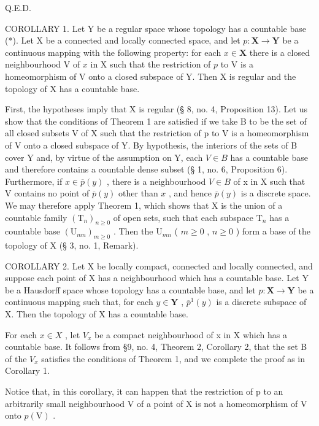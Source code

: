 Q.E.D.

COROLLARY 1. Let Y be a regular space whose topology has a countable base (*). Let X be a connected and locally connected space, and let \(p: \mathbf{X} \to \mathbf{Y}\) be a continuous mapping with the following property: for each \(x \in \mathbf{X}\) there is a closed neighbourhood V of \(x\) in X such that the restriction of \(p\) to V is a homeomorphism of V onto a closed subspace of Y. Then X is regular and the topology of X has a countable base.

First, the hypotheses imply that X is regular (§ 8, no. 4, Proposition 13). Let us show that the conditions of Theorem 1 are satisfied if we take B to be the set of all closed subsets V of X such that the restriction of p to V is a homeomorphism of V onto a closed subspace of Y. By hypothesis, the interiors of the sets of B cover Y and, by virtue of the assumption on Y, each \(V \in B\) has a countable base and therefore contains a countable dense subset (§ 1, no. 6, Proposition 6). Furthermore, if \(x \in \overline{p}(y)\) , there is a neighbourhood \(V \in B\) of x in X such that V contains no point of \(\overline{p}(y)\) other than \(x\) , and hence \(\overline{p}(y)\) is a discrete space. We may therefore apply Theorem 1, which shows that X is the union of a countable family \((\mathrm{T}_n)_{n\geqslant 0}\) of open sets, such that each subspace \(\mathrm{T}_n\) has a countable base \((\mathrm{U}_{mn})_{m\geqslant 0}\) . Then the \(\mathrm{U}_{mn}\) ( \(m\geqslant 0\) , \(n\geqslant 0\) ) form a base of the topology of X (§ 3, no. 1, Remark).

COROLLARY 2. Let X be locally compact, connected and locally connected, and suppose each point of X has a neighbourhood which has a countable base. Let Y be a Hausdorff space whose topology has a countable base, and let \(p: \mathbf{X} \to \mathbf{Y}\) be a continuous mapping such that, for each \(y \in \mathbf{Y}\) , \(\overline{p}^1(y)\) is a discrete subspace of X. Then the topology of X has a countable base.

For each \(x \in X\) , let \(V_{x}\) be a compact neighbourhood of x in X which has a countable base. It follows from §9, no. 4, Theorem 2, Corollary 2, that the set B of the \(V_{x}\) satisfies the conditions of Theorem 1, and we complete the proof as in Corollary 1.

Notice that, in this corollary, it can happen that the restriction of p to an arbitrarily small neighbourhood V of a point of X is not a homeomorphism of V onto \(p(\mathrm{V})\) .

